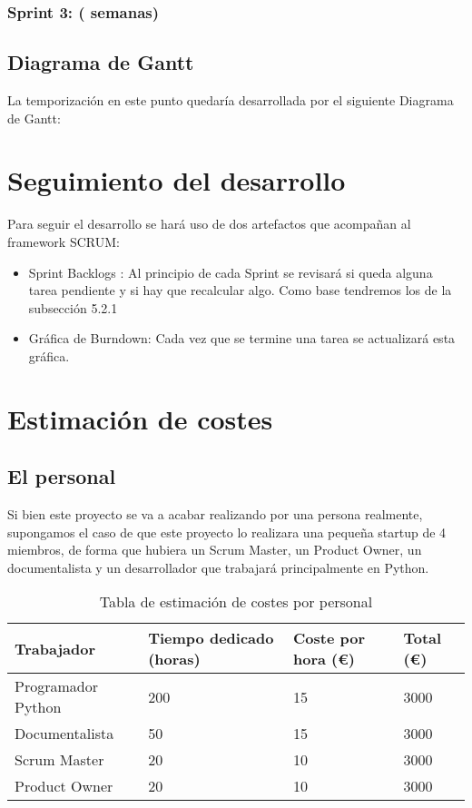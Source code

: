 \subsubsection{Sprint 3: ( semanas)}

\subsection{Diagrama de Gantt}
La temporización en este punto quedaría desarrollada por el siguiente Diagrama de Gantt:


\section{Seguimiento del desarrollo}
Para seguir el desarrollo se hará uso de dos artefactos que acompañan al framework SCRUM:
\begin{itemize}
	\item Sprint Backlogs : Al principio de cada Sprint se revisará si queda alguna tarea pendiente y si hay que recalcular algo. Como base tendremos los de la subsección 5.2.1
	\item Gráfica de Burndown: Cada vez que se termine una tarea se actualizará esta gráfica.
\end{itemize}

\section{Estimación de costes}
\subsection{El personal}
Si bien este proyecto se va a acabar realizando por una persona realmente, supongamos el caso de que este proyecto lo realizara una pequeña startup de 4 miembros, de forma que hubiera un Scrum Master, un Product Owner, un documentalista y un desarrollador que trabajará principalmente en Python.

\begin{center}
	\begin{table}[H]
		\centering
		\begin{tabularx}{\textwidth}{|X|X|X|X|}
			\hline
			\cellcolor{lightblue}\textbf{Trabajador} & \cellcolor{lightblue}\textbf{Tiempo dedicado (horas)} & \cellcolor{lightblue}\textbf{Coste por hora (€)} & \cellcolor{lightblue}\textbf{Total (€)} \\
			\hline
			Programador Python & 200 & 15 & 3000\\
			\hline
			Documentalista & 50 & 15 & 3000\\
			\hline
			Scrum Master & 20 & 10 & 3000\\
			\hline
			Product Owner & 20 & 10 & 3000\\
			\hline
		\end{tabularx}
		\caption{Tabla de estimación de costes por personal}
	\end{table}
\end{center}
	
